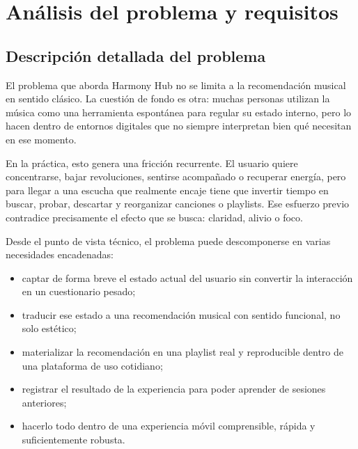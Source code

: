 \chapter{Análisis del problema y requisitos}
\label{ch:analisis_problema}


\section{Descripción detallada del problema}
\label{sec:descripcion_problema}

El problema que aborda Harmony Hub no se limita a la recomendación musical en sentido clásico. La cuestión de fondo es otra: muchas personas utilizan la música como una herramienta espontánea para regular su estado interno, pero lo hacen dentro de entornos digitales que no siempre interpretan bien qué necesitan en ese momento.

En la práctica, esto genera una fricción recurrente. El usuario quiere concentrarse, bajar revoluciones, sentirse acompañado o recuperar energía, pero para llegar a una escucha que realmente encaje tiene que invertir tiempo en buscar, probar, descartar y reorganizar canciones o playlists. Ese esfuerzo previo contradice precisamente el efecto que se busca: claridad, alivio o foco.

Desde el punto de vista técnico, el problema puede descomponerse en varias necesidades encadenadas:

\begin{itemize}
    \item captar de forma breve el estado actual del usuario sin convertir la interacción en un cuestionario pesado;
    \item traducir ese estado a una recomendación musical con sentido funcional, no solo estético;
    \item materializar la recomendación en una playlist real y reproducible dentro de una plataforma de uso cotidiano;
    \item registrar el resultado de la experiencia para poder aprender de sesiones anteriores;
    \item hacerlo todo dentro de una experiencia móvil comprensible, rápida y suficientemente robusta.
\end{itemize}

